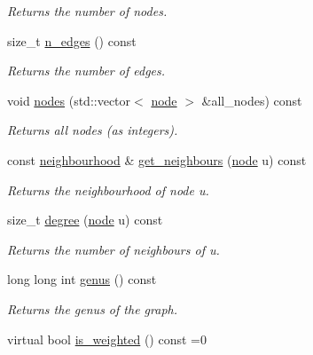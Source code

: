 \begin{DoxyCompactItemize}
\begin{DoxyCompactList}\small\item\em Returns the number of nodes. \end{DoxyCompactList}\item 
size\+\_\+t \hyperlink{classlgraph_1_1xxgraph_af00bce8b07a42754601d1e3bebe2c1fa}{n\+\_\+edges} () const
\begin{DoxyCompactList}\small\item\em Returns the number of edges. \end{DoxyCompactList}\item 
\mbox{\label{classlgraph_1_1xxgraph_a9a24f0e1c0c40abc505e35d0dd9bf10a}} 
void \hyperlink{classlgraph_1_1xxgraph_a9a24f0e1c0c40abc505e35d0dd9bf10a}{nodes} (std\+::vector$<$ \hyperlink{namespacelgraph_a397169dd66adf725210a30fb7251773e}{node} $>$ \&all\+\_\+nodes) const
\begin{DoxyCompactList}\small\item\em Returns all nodes (as integers). \end{DoxyCompactList}\item 
const \hyperlink{namespacelgraph_a052e7766c13f3a43cec0aec8173fdede}{neighbourhood} \& \hyperlink{classlgraph_1_1xxgraph_a745a535506115c66ce0993ef7e7759ba}{get\+\_\+neighbours} (\hyperlink{namespacelgraph_a397169dd66adf725210a30fb7251773e}{node} u) const
\begin{DoxyCompactList}\small\item\em Returns the neighbourhood of node u. \end{DoxyCompactList}\item 
size\+\_\+t \hyperlink{classlgraph_1_1xxgraph_a20ebc2927ee8fb8bb0a2c3b448d9ed78}{degree} (\hyperlink{namespacelgraph_a397169dd66adf725210a30fb7251773e}{node} u) const
\begin{DoxyCompactList}\small\item\em Returns the number of neighbours of u. \end{DoxyCompactList}\item 
long long int \hyperlink{classlgraph_1_1xxgraph_a5f48a91046766e3e0b71a3326f2b9153}{genus} () const
\begin{DoxyCompactList}\small\item\em Returns the genus of the graph. \end{DoxyCompactList}\item 
virtual bool \hyperlink{classlgraph_1_1xxgraph_a0bd329c5dcbded569658b59462a08acf}{is\+\_\+weighted} () const =0

\end{DoxyCompactItemize}
